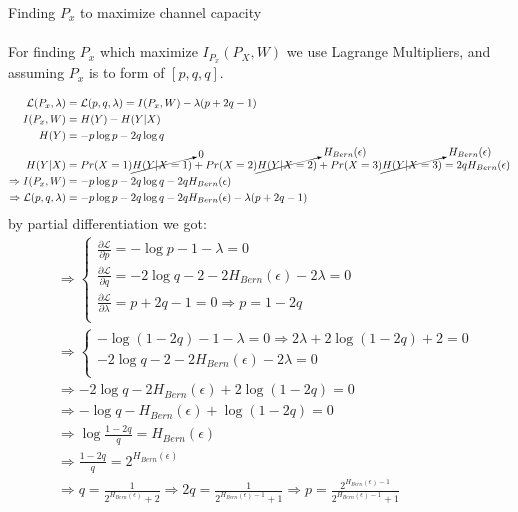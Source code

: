 \documentclass[
  course = {{EE623 Information Theory}},
  quartile = {{Fall 2020}},
  assignment = 6,
  name = {{Mohammad Mahdi Rahimi}},
  studentnumber = {{20208244}},
  email = {{mahi@kaist.ac.kr}},
  firstexercise = 1
]{aga-homework}
\begin{document}
\exercise Finding $P_x$ to maximize channel capacity
\\\\
For finding $P_x$ which maximize $I_{P_x}(P_X, W)$ we use Lagrange Multipliers, and assuming $P_x$ is to form of $[p,q,q]$. 

\begin{equation} \label{eq3}
\begin{split}
\mathcal{L}(P_x, \lambda) & = \mathcal{L}(p, q, \lambda) = I(P_x, W) - \lambda(p + 2q - 1) \\
I(P_x, W) & = H(Y) - H(Y|X)\\
H(Y) & =  - p\log{p} - 2q\log{q}\\
H(Y|X) & =  Pr(X=1)\cancelto{0}{H(Y|X=1)}+Pr(X=2)\cancelto{H_{Bern}(\epsilon)}{H(Y|X=2)}+Pr(X=3)\cancelto{H_{Bern}(\epsilon)}{H(Y|X=3)} = 2qH_{Bern}(\epsilon)\\
\Rightarrow I(P_x, W) & = - p\log{p} - 2q\log{q} - 2qH_{Bern}(\epsilon)\\
\Rightarrow \mathcal{L}(p, q, \lambda) & =  - p\log{p} - 2q\log{q} - 2qH_{Bern}(\epsilon) - \lambda(p + 2q - 1)
\end{split}
\end{equation}
by partial differentiation we got:
\begin{equation} \label{eq3}
\begin{split}
& \Rightarrow \begin{cases}
\frac{\partial\mathcal{L}}{\partial p} = -\log{p} - 1 - \lambda = 0\\
\frac{\partial\mathcal{L}}{\partial q} = -2\log{q} - 2 - 2H_{Bern}(\epsilon) - 2\lambda = 0\\
\frac{\partial\mathcal{L}}{\partial \lambda} = p + 2q - 1 = 0 \Rightarrow p = 1 - 2q\\
\end{cases}\\
& \Rightarrow \begin{cases}
-\log{(1 -2q)} - 1 - \lambda = 0 \Rightarrow 2\lambda + 2\log{(1 -2q)} + 2 = 0\\
-2\log{q} - 2 - 2H_{Bern}(\epsilon) - 2\lambda = 0\\
\end{cases}\\
&\Rightarrow -2\log{q} - 2H_{Bern}(\epsilon) + 2\log{(1 -2q)} = 0\\
&\Rightarrow -\log{q} - H_{Bern}(\epsilon) + \log{(1 -2q)} = 0\\
&\Rightarrow \log{\frac{1 -2q}{q}} = H_{Bern}(\epsilon)\\
&\Rightarrow \frac{1 -2q}{q} = 2^{H_{Bern}(\epsilon)}\\
&\Rightarrow q = \frac{1}{2^{H_{Bern}(\epsilon)} + 2} \Rightarrow 2q = \frac{1}{2^{H_{Bern}(\epsilon) - 1} + 1} \Rightarrow p = \frac{2^{H_{Bern}(\epsilon) - 1}}{2^{H_{Bern}(\epsilon) - 1} + 1}\\
\end{split}
\end{equation}
\end{document}
